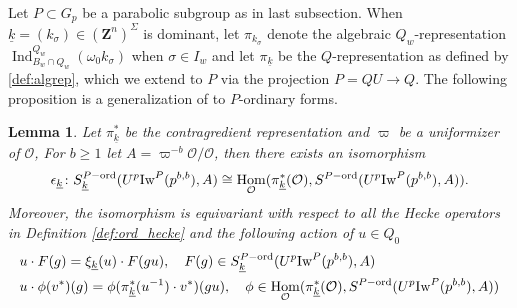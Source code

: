 \documentclass[leqno]{amsart}
\newcommand{\wt}[1]{\underline{ #1 }}
\newcommand{\Iw}{\textnormal{Iw}}
\newcommand{\ord}{\textnormal{ord}}
\newcommand{\Z}{{\mathbf{Z}}}
\newcommand{\oo}{\mathcal{O}} %
\DeclareMathOperator{\Hom}{Hom}
\DeclareMathOperator{\Ind}{Ind}
\newtheorem{lem}[thm]{Lemma}
\theoremstyle{definition}
\theoremstyle{remark}
\begin{document}
Let $P\subset G_p$ be a parabolic subgroup 
as in last subsection.
When $\wt{k}=(k_\sigma)\in (\Z^n)^{\Sigma}$ is dominant,
let $\pi_{k_{\sigma}}$
denote the algebraic $Q_w$-representation
$\Ind_{B_w\cap Q_w}^{Q_w}(\omega_0 k_\sigma)$
when $\sigma\in I_w$
and let  $\pi_{\wt{k}}$
be the $Q$-representation
as defined by \eqref{def:algrep},
which we extend to $P$ via the projection  $P=QU\to Q$.
The following proposition
is a generalization of \cite[Prop 2.22]{ger}
to $P$-ordinary forms.

\begin{lem}
	Let $\pi_{\wt{k}}^*$ be the contragredient
	representation and
	$\varpi$ be a uniformizer of $\oo$,
	For $b\geq 1$ let $A=\varpi^{-b}\oo/\oo$,
	then there exists an isomorphism
	\[
		\epsilon_{\wt{k}} \colon 
		S_{\wt{k}}^{P-\ord}(U^p\Iw^P(p^{b,b}),A)\cong 
		\Hom_{\oo}(\pi_{\wt{k}}^*(\oo),
		S^{P-\ord}(U^p\Iw^P(p^{b,b}),A)).
	\]
	Moreover, the isomorphism is equivariant 
	with respect to all the Hecke operators
	in Definition \ref{def:ord_hecke}
	and the following action of $u\in Q_0$
	\begin{align*}
	&u\cdot F(g)=\xi_{\wt{k}}(u)\cdot F(gu),\quad
	F(g)\in S_{\wt{k}}^{P-\ord}(U^p\Iw^P(p^{b,b}),A)\\
	&u\cdot \phi(v^*)(g)=
	\phi(\pi^*_{\wt{k}}(u^{-1})\cdot v^*)(gu),\quad
	\phi\in \Hom_{\oo}(\pi_{\wt{k}}^*(\oo),
	S^{P-\ord}(U^p\Iw^P(p^{b,b}),A))
	\end{align*}
\end{lem}
\end{document}
